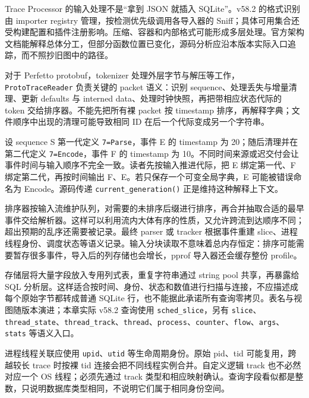 \documentclass[UTF8,fontset=fandol,openany,11pt]{ctexbook}
\begin{document}
Trace Processor 的输入处理不是“拿到 JSON 就插入 SQLite”。v58.2 的格式识别由 importer registry 管理，按检测优先级调用各导入器的 Sniff；具体可用集合还受构建配置和插件注册影响。压缩、容器和内部格式可能形成多层处理。官方架构文档能解释总体分工，但部分函数位置已变化，源码分析应沿本版本实际入口追踪，而不照抄旧图中的路径。\cite{pf-detection}\cite{pf-importers}\cite{pf-architecture}


对于 Perfetto protobuf，tokenizer 处理外层字节与解压等工作，\texttt{ProtoTraceReader} 负责关键的 packet 语义：识别 sequence、处理丢失与增量清理、更新 defaults 与 interned data、处理时钟快照，再把带相应状态代际的 token 交给排序器。不能先把所有裸 packet 按 timestamp 排序，再解释字典；文件顺序中出现的清理可能导致相同 ID 在后一个代际变成另一个字符串。\cite{pf-reader}


设 sequence S 第一代定义 \texttt{7=Parse}，事件 E 的 timestamp 为 20；随后清理并在第二代定义 \texttt{7=Encode}，事件 F 的 timestamp 为 10。不同时间来源或迟交付会让事件时间与输入顺序不完全一致。读者先按输入推进代际，把 E 绑定第一代、F 绑定第二代，再按时间输出 F、E。若只保存一个可变全局字典，E 可能被错误命名为 Encode。源码传递 \texttt{current\_\allowbreak{}generation()} 正是维持这种解释上下文。\cite{pf-reader}\cite{pf-sequence}


排序器按输入流维护队列，对需要的未排序后缀进行排序，再合并抽取合适的最早事件交给解析器。这样可以利用流内大体有序的性质，又允许跨流到达顺序不同；超出预期的乱序还需要被记录。最终 parser 或 tracker 根据事件重建 slice、进程线程身份、调度状态等语义记录。输入分块读取不意味着总内存恒定：排序可能需要暂存很多事件，导入后的列存储也会增长，pprof 导入器还会缓存整份 profile。\cite{pf-sorter}\cite{pf-pprof}


存储层将大量字段放入专用列式表，重复字符串通过 string pool 共享，再暴露给 SQL 分析层。这样适合按时间、身份、状态和数值进行扫描与连接，不应描述成每个原始字节都转成普通 SQLite 行，也不能据此承诺所有查询零拷贝。表名与视图随版本演进；本章实际 v58.2 查询使用 \texttt{sched\_\allowbreak{}slice}，另有 \texttt{slice}、\texttt{thread\_\allowbreak{}state}、\texttt{thread\_\allowbreak{}track}、\texttt{thread}、\texttt{process}、\texttt{counter}、\texttt{flow}、\texttt{args}、\texttt{stats} 等语义入口。\cite{pf-storage}\cite{pf-request}


进程线程关联应使用 \texttt{upid}、\texttt{utid} 等生命周期身份。原始 pid、tid 可能复用，跨越较长 trace 时按裸 tid 连接会把不同线程实例合并。自定义逻辑 track 也不必然对应一个 OS 线程；必须先通过 track 类型和相应映射确认。查询字段看似都是整数，只说明数据库类型相同，不说明它们属于相同身份空间。\cite{pf-storage}\cite{pf-thread-state}
\end{document}
